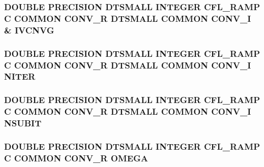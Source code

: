 \hypertarget{conv_8com_acef83c369dada2c28e14e0bbf42054cf}{
\subsubsection[{I\-V\-C\-N\-V\-G}]{\setlength{\rightskip}{0pt plus 5cm}D\-O\-U\-B\-L\-E P\-R\-E\-C\-I\-S\-I\-O\-N D\-T\-S\-M\-A\-L\-L I\-N\-T\-E\-G\-E\-R C\-F\-L\-\_\-\-R\-A\-M\-P C C\-O\-M\-M\-O\-N C\-O\-N\-V\-\_\-\-R D\-T\-S\-M\-A\-L\-L C\-O\-M\-M\-O\-N C\-O\-N\-V\-\_\-\-I \& I\-V\-C\-N\-V\-G}}\label{conv_8com_acef83c369dada2c28e14e0bbf42054cf}
\hypertarget{conv_8com_a0a434a625bddcbee262d330f471d5b54}{
\subsubsection[{N\-I\-T\-E\-R}]{\setlength{\rightskip}{0pt plus 5cm}D\-O\-U\-B\-L\-E P\-R\-E\-C\-I\-S\-I\-O\-N D\-T\-S\-M\-A\-L\-L I\-N\-T\-E\-G\-E\-R C\-F\-L\-\_\-\-R\-A\-M\-P C C\-O\-M\-M\-O\-N C\-O\-N\-V\-\_\-\-R D\-T\-S\-M\-A\-L\-L C\-O\-M\-M\-O\-N C\-O\-N\-V\-\_\-\-I N\-I\-T\-E\-R}}\label{conv_8com_a0a434a625bddcbee262d330f471d5b54}
\hypertarget{conv_8com_aceeea16657a8729e23a6145062b0af71}{
\subsubsection[{N\-S\-U\-B\-I\-T}]{\setlength{\rightskip}{0pt plus 5cm}D\-O\-U\-B\-L\-E P\-R\-E\-C\-I\-S\-I\-O\-N D\-T\-S\-M\-A\-L\-L I\-N\-T\-E\-G\-E\-R C\-F\-L\-\_\-\-R\-A\-M\-P C C\-O\-M\-M\-O\-N C\-O\-N\-V\-\_\-\-R D\-T\-S\-M\-A\-L\-L C\-O\-M\-M\-O\-N C\-O\-N\-V\-\_\-\-I N\-S\-U\-B\-I\-T}}\label{conv_8com_aceeea16657a8729e23a6145062b0af71}
\hypertarget{conv_8com_a27b76f3b783d9cc5fffe85f1e22ecb89}{
\subsubsection[{O\-M\-E\-G\-A}]{\setlength{\rightskip}{0pt plus 5cm}D\-O\-U\-B\-L\-E P\-R\-E\-C\-I\-S\-I\-O\-N D\-T\-S\-M\-A\-L\-L I\-N\-T\-E\-G\-E\-R C\-F\-L\-\_\-\-R\-A\-M\-P C C\-O\-M\-M\-O\-N C\-O\-N\-V\-\_\-\-R O\-M\-E\-G\-A}}\label{conv_8com_a27b76f3b783d9cc5fffe85f1e22ecb89}
